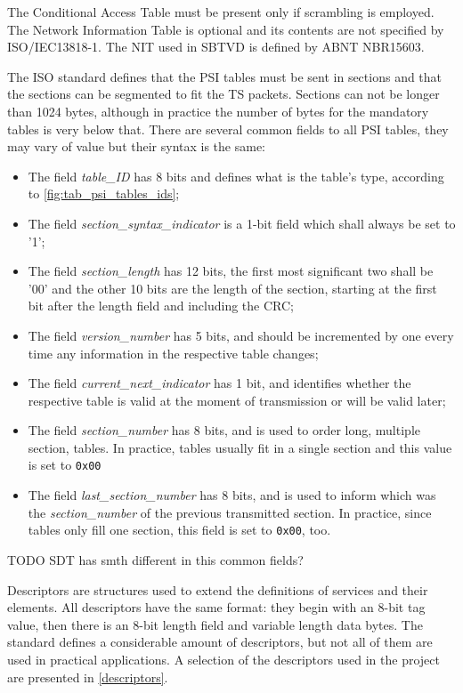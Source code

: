 \documentclass[
	12pt,				%
	openright,			%
	twoside,			%
	a4paper,			%
	brazil,
	french,				%
	english
	]{abntex2}
\begin{document}
The Conditional Access Table must be present only if scrambling is employed. The Network Information Table is optional and its contents are not specified by ISO/IEC13818-1. The NIT used in SBTVD is defined by ABNT NBR15603.

The ISO standard defines that the PSI tables must be sent in sections and that the sections can be segmented to fit the TS packets. Sections can not be longer than 1024 bytes, although in practice the number of bytes for the mandatory tables is very below that. There are several common fields to all PSI tables, they may vary of value but their syntax is the same:
\begin{itemize}
\item{The field \textit{table\_ID} has 8 bits and defines what is the table's type, according to \autoref{fig:tab_psi_tables_ids};}
\item{The field \textit{section\_syntax\_indicator} is a 1-bit field which shall always be set to '1';}
\item{The field \textit{section\_length} has 12 bits, the first most significant two shall be '00' and the other 10 bits are the length of the section, starting at the first bit after the length field and including the CRC;}
\item{The field \textit{version\_number} has 5 bits, and should be incremented by one every time any information in the respective table changes;}
\item{The field \textit{current\_next\_indicator} has 1 bit, and identifies whether the respective table is valid at the moment of transmission or will be valid later;}
\item{The field \textit{section\_number} has 8 bits, and is used to order long, multiple section, tables. In practice, tables usually fit in a single section and this value is set to \texttt{0x00}}
\item{The field \textit{last\_section\_number} has 8 bits, and is used to inform which was the \textit{section\_number} of the previous transmitted section. In practice, since tables only fill one section, this field is set to \texttt{0x00}, too.}
\end{itemize}

TODO SDT has smth different in this common fields?

Descriptors are structures used to extend the definitions of services and their elements. All descriptors have the same format: they begin with an 8-bit tag value, then there is an 8-bit length field and variable length data bytes. The standard defines a considerable amount of descriptors, but not all of them are used in practical applications. A selection of the descriptors used in the project are presented in \autoref{descriptors}.
\end{document}
